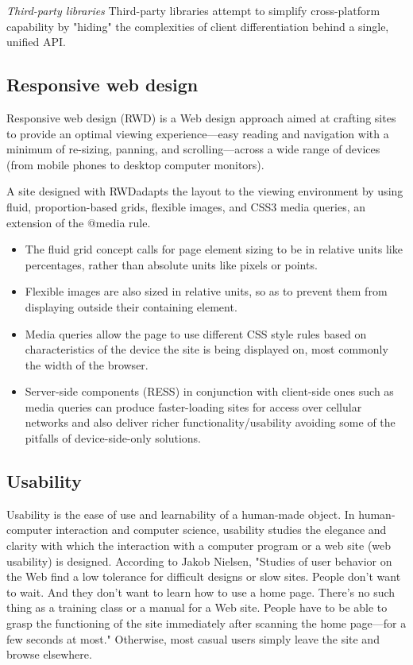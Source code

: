 	\emph{Third-party libraries}
	\newline
	Third-party libraries attempt to simplify cross-platform capability by "hiding" the complexities of client differentiation behind a single, unified API.


\subsection {Responsive web design}
	Responsive web design (RWD)\cite{ wiki:RWD, CSS3} is a Web design approach aimed at crafting sites to provide an optimal viewing experience—easy reading and navigation with a minimum of re-sizing, panning, and scrolling—across a wide range of devices (from mobile phones to desktop computer monitors).

	A site designed with RWD\cite{pettit, ethan}adapts the layout to the viewing environment by using fluid, proportion-based grids, flexible images, and CSS3 media queries, an extension of the @media rule.
    \begin{itemize}
	\item The fluid grid concept calls for page element sizing to be in relative units like percentages, rather than absolute units like pixels or points. 
	\item Flexible images are also sized in relative units, so as to prevent them from displaying outside their containing element. 
	\item Media queries allow the page to use different CSS style rules based on characteristics of the device the site is being displayed on, most commonly the width of the browser. 
	\item Server-side components (RESS) in conjunction with client-side ones such as media queries can produce faster-loading sites for access over cellular networks and also deliver richer functionality/usability avoiding some of the pitfalls of device-side-only solutions.
	\end{itemize}

\subsection {Usability}
     Usability is the ease of use and learnability of a human-made object. In human-computer interaction and computer science, usability studies the elegance and clarity with which the interaction with a computer program or a web site (web usability) is designed.
	 According to Jakob Nielsen, "Studies of user behavior on the Web find a low tolerance for difficult designs or slow sites. People don't want to wait. And they don't want to learn how to use a home page. There's no such thing as a training class or a manual for a Web site. People have to be able to grasp the functioning of the site immediately after scanning the home page—for a few seconds at most."\cite{wiki:usability} Otherwise, most casual users simply leave the site and browse elsewhere.

